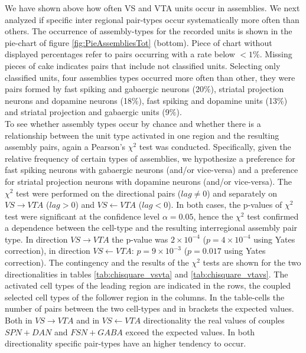  We have shown above how often VS and VTA units occur in assemblies. We next analyzed if specific inter regional pair-types occur systematically more often than others. The occurrence of assembly-types for the recorded units is shown in the pie-chart of figure  \ref{fig:PieAssembliesTot} (bottom). Piece of chart without displayed percentages refer to pairs occurring with a rate below $< 1\%$.  Missing pieces of cake indicates pairs that include not classified units. Selecting only classified units, four assemblies types occurred more often than other, they were pairs formed by fast spiking and gabaergic neurons (20$\%$), striatal projection neurons and dopamine neurons (18$\%$), fast spiking and dopamine units (13$\%$) and striatal projection and gabaergic units (9$\%$).\\
To see whether assembly types occur by chance and whether there is a relationship between the unit type activated in one region and the resulting assembly pairs, again a Pearson's $\chi^2$ test was conducted. Specifically, given the relative frequency of certain types of assemblies, we hypothesize a preference for fast spiking neurons with gabaergic neurons (and/or vice-versa) and a preference for striatal projection neurons with dopamine neurons (and/or vice-versa). The $\chi^2$ test were performed on the directional pairs ($lag\neq0$) and separately on $VS\rightarrow VTA$ ($lag>0$) and $VS\leftarrow VTA$ ($lag<0$). In both cases, the p-values of $\chi^2$ test were significant at the confidence level $\alpha = 0.05$, hence the $\chi^2$ test confirmed a dependence between the cell-type and the resulting interregional assembly pair type. In direction $VS\rightarrow VTA$ the p-value was $2\times10^{-4}$ ($p=4\times10^{-4}$ using Yates correction), in direction $VS\leftarrow VTA$: $p=9\times10^{-3}$ ($p=0.017$ using Yates correction). The contingency and the results of the $\chi^2$ tests are shown for the two directionalities in tables \ref{tab:chisquare_vsvta} and \ref{tab:chisquare_vtavs}. The activated cell types of the leading region are indicated in the rows, the coupled selected cell types of the follower region in the columns. In the table-cells the number of pairs between the two cell-types and in brackets the expected values. Both in $VS\rightarrow VTA$ and in $VS\leftarrow VTA$ directionality the real values of couples $SPN+DAN$ and $FSN+GABA$ exceed the expected values. In both directionality specific pair-types have an higher tendency to occur.\\ 
